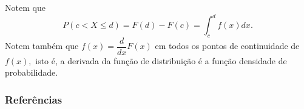 \documentclass[14pt,aspectratio=1610]{beamer}
\begin{document}
\begin{frame}{}
\frametitle{}
\begin{block}{}
\justifying
Notem que $$P(c<X\leq d)=F(d)-F(c)=\int_{c}^{d}f(x)dx.$$ Notem também que $f(x)=\dfrac{d}{dx}F(x)$ em todos os pontos de continuidade de $f(x),$ isto é, a derivada da
função de distribuição é a função densidade de probabilidade.
\end{block}
\nocite{Morettin09, Apostila, eric, montgomery2016, meyer1982probabilidade, Bastos2025}
\end{frame}

\begin{frame}[allowframebreaks]
\frametitle{\bf Referências}
\printbibliography
\end{frame}
\end{document}

